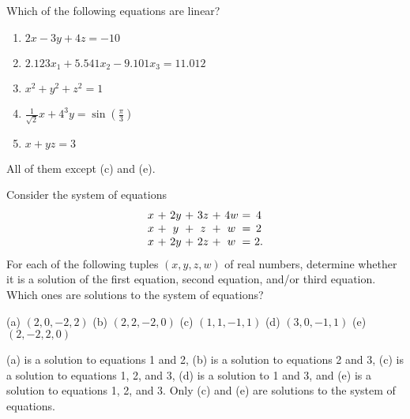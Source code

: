 \begin{ex}
  Which of the following equations are linear?
  \begin{enumerate}
  \item[(a)] $2x-3y+4z = -10$
  \item[(b)] $2.123x_1 + 5.541x_2 - 9.101x_3 = 11.012$
  \item[(c)] $x^2+y^2+z^2 = 1$
  \item[(d)] $\frac{1}{\sqrt{2}}x+4^3y = \sin(\frac{\pi}{3})$
  \item[(e)] $x+yz = 3$
  \end{enumerate}

  \begin{sol}
    All of them except (c) and (e).
  \end{sol}
\end{ex}

\begin{ex}
  Consider the system of equations
  \begin{equation*}
    \begin{array}{c@{~}c@{~}c@{~}c@{~}c@{~}c@{~}c@{~}c@{~}c}
      x&+&2y&+&3z&+&4w &=& 4\\
      x&+&y&+&z&+&w &=& 2\\
      x&+&2y&+&2z&+&w &=& 2.
    \end{array}
  \end{equation*}
  For each of the following tuples $(x,y,z,w)$ of real numbers,
  determine whether it is a solution of the first equation, second
  equation, and/or third equation. Which ones are solutions to the
  system of equations?

  \begin{center}
    (a) $(2,0,-2,2)$ \quad
    (b) $(2,2,-2,0)$ \quad
    (c) $(1,1,-1,1)$ \quad
    (d) $(3,0,-1,1)$ \quad
    (e) $(2,-2,2,0)$
  \end{center}

  \begin{sol}
    (a) is a solution to equations 1 and 2, (b) is a solution to
    equations 2 and 3, (c) is a solution to equations 1, 2, and 3,
    (d) is a solution to 1 and 3, and (e) is a solution to equations
    1, 2, and 3. Only (c) and (e) are solutions to the system of
    equations. 
  \end{sol}
\end{ex}
